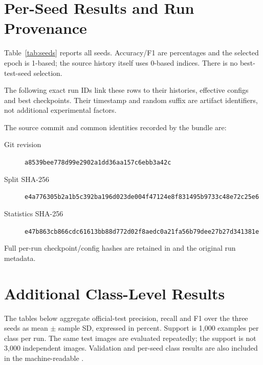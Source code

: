 \section{Per-Seed Results and Run Provenance}
\label{app:runs}
Table~\ref{tab:seeds} reports all seeds. Accuracy/F1 are percentages and the
selected epoch is 1-based; the source history itself uses 0-based indices.
There is no best-test-seed selection.
\begin{table}[H]\centering\footnotesize
\caption{All 15 selected checkpoints and their evaluation results.}
\label{tab:seeds}

\end{table}
The following exact run IDs link these rows to their histories, effective configs
and best checkpoints. Their timestamp and random suffix are artifact identifiers,
not additional experimental factors.
\begin{table}[H]\centering
{\fontsize{9}{11}\selectfont
\setlength{\tabcolsep}{3pt}
}
\caption{Exact run identifiers. The \texttt{rnn} artifact name denotes the GRU configuration.}
\label{tab:ids}
\end{table}
The source commit and common identities recorded by the bundle are:
\begin{description}
\item[Git revision] \small\texttt{a8539bee778d99e2902a1dd36aa157c6ebb3a42c}
\item[Split SHA-256] \small\texttt{e4a776305b2a1b5c392ba196d023de004f47124e8f831495b9733c48e72c25e6}
\item[Statistics SHA-256] \small\texttt{e47b863cb866cdc61613bb88d772d02f8aedc0a21fa56b79dee27b27d341381e}
\end{description}
Full per-run checkpoint/config hashes are retained in
 and the original run metadata.
\FloatBarrier

\section{Additional Class-Level Results}
\label{app:class}
The tables below aggregate official-test precision, recall and F1 over the three
seeds as mean \(\pm\) sample SD, expressed in percent. Support is 1,000 examples
per class per run. The same test images are evaluated repeatedly; the support
is not 3,000 independent images. Validation and per-seed class results are also
included in the machine-readable .

\begin{table}[H]\centering\small
\caption{Linear official-test per-class metrics, mean \(\pm\) sample SD, \(n=3\).}

\end{table}

